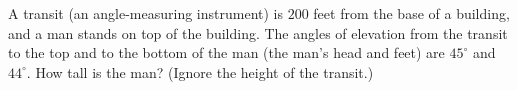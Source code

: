 A transit (an angle-measuring instrument) is $200$ feet from the base of a building, and a man stands on top of the building. The angles of elevation from the transit to the top and to the bottom of the man (the man's head and feet) are $45^\circ$ and $44^\circ$. How tall is the man? (Ignore the height of the transit.)
